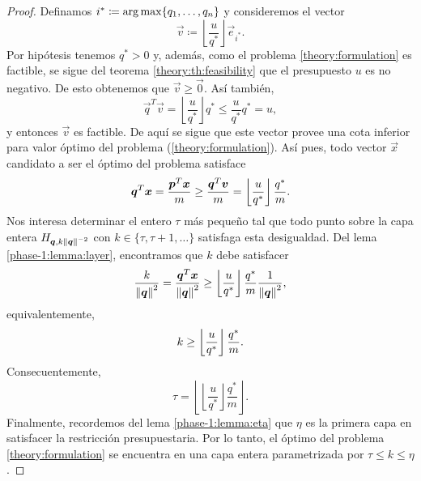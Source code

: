 \begin{proof}
	Definamos $i^* \coloneq \operatorname{arg\,max}\lbrace q_1, \ldots, q_n \rbrace$ y consideremos el vector
	\begin{equation*}
		\vec{v} \coloneq \left\lfloor \frac{u}{q^*} \right\rfloor \vec{e}_{i^*}.
	\end{equation*}
	Por hipótesis tenemos $q^* > 0$ y, además, como el problema
	\eqref{theory:formulation} es factible, se sigue del teorema \ref{theory:th:feasibility} que el
	presupuesto $u$ es no negativo. De esto obtenemos que $\vec{v} \geq \vec{0}$. Así también,
	\begin{equation*}
		\vec{q}^T\vec{v} = \left\lfloor \frac{u}{q^*} \right\rfloor q^*
		\leq \frac{u}{q^*}q^* = u,
	\end{equation*}
	y entonces $\vec{v}$ es factible. De aquí se sigue que este vector provee
	una cota inferior para valor óptimo del problema
	(\ref{theory:formulation}). Así pues, todo vector $\vec{x}$ candidato a ser
	el óptimo del problema satisface
	\begin{equation*}
		\boldsymbol{q}^T\boldsymbol{x} = \frac{\boldsymbol{p}^T\boldsymbol{x}}{m} \geq \frac{\boldsymbol{q}^T\boldsymbol{v}}{m} = 
		\left\lfloor \frac{u}{q^*} \right\rfloor \frac{q^*}{m}.
	\end{equation*}
	Nos interesa determinar el entero $\tau$ más pequeño tal que todo punto sobre la capa
	entera $H_{\boldsymbol{q}, k\left\lVert \boldsymbol{q} \right\rVert^{-2}}$ con $k \in \lbrace \tau, \tau + 1, \ldots \rbrace$
	satisfaga esta desigualdad. Del lema \ref{phase-1:lemma:layer}, encontramos que $k$ debe satisfacer
	\begin{equation*}
		\frac{k}{\left\lVert \boldsymbol{q} \right\rVert^{2}} = \frac{\boldsymbol{q}^T\boldsymbol{x}}{\left\lVert \boldsymbol{q} \right\rVert^2} \geq
		\left\lfloor \frac{u}{q^*} \right\rfloor \frac{q^*}{m}
		\frac{1}{\left\lVert \boldsymbol{q} \right\rVert^2},
	\end{equation*}
	equivalentemente,
	\begin{equation*}
		k \geq \left\lfloor \frac{u}{q^*} \right\rfloor\frac{q^*}{m}.
	\end{equation*}
	Consecuentemente,
	\begin{equation*}
		\tau =
		\left\lfloor \left\lfloor \frac{u}{q^*} \right\rfloor \frac{q^*}{m}
			\right\rfloor.
	\end{equation*}
	Finalmente, recordemos del lema \ref{phase-1:lemma:eta} que $\eta$ es la primera capa en
	satisfacer la restricción presupuestaria. Por lo tanto, el óptimo del problema
	\eqref{theory:formulation} se encuentra en una capa entera parametrizada por $\tau \leq k \leq \eta$.
\end{proof}

